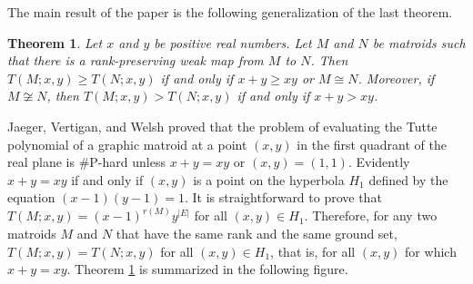\documentclass[12pt,reqno]{amsart}
\newtheorem{theorem}{Theorem}
\theoremstyle{definition}
\theoremstyle{remark}
\numberwithin{equation}{section}
\begin{document}
The main result of the paper is the following generalization of the last theorem. 

    \begin{theorem}\label{main}
        Let $x$ and $y$ be positive real numbers. Let $M$ and $N$ be matroids such that there is a rank-preserving weak map from $M$ to $N$. Then $T(M;x,y)\geq T(N;x,y)$ if and only if $x+y\geq xy$ or $M\cong N$. Moreover, if $M\not\cong N$, then $T(M;x,y)>T(N;x,y)$ if and only if $x+y>xy$.  
    \end{theorem}

Jaeger, Vertigan, and Welsh \cite{jaeger} proved that the problem of evaluating the Tutte polynomial of a graphic matroid at a point $(x,y)$ in the first quadrant of the real plane is \#P-hard unless $x+y=xy$ or $(x,y)=(1,1)$. 
Evidently $x+y=xy$ if and only if $(x,y)$ is a point on the hyperbola $H_1$ defined by the equation $(x-1)(y-1)=1$.  
It is straightforward to prove that $T(M;x,y)=(x-1)^{r(M)}y^{|E|}$ for all $(x,y)\in H_1$. 
Therefore, for any two matroids $M$ and $N$ that have the same rank and the same ground set, $T(M;x,y)=T(N;x,y)$ for all $(x,y)\in H_1$, that is, for all $(x,y)$ for which $x+y=xy$. Theorem \ref{main} is summarized in the following figure. 
\end{document}
